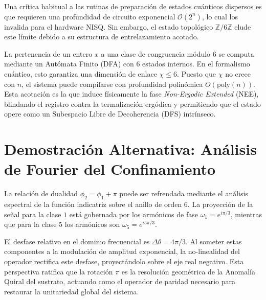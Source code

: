 \documentclass[12pt,a4paper]{article}
\theoremstyle{plain}
\theoremstyle{definition}
\theoremstyle{remark}
\begin{document}
Una crítica habitual a las rutinas de preparación de estados cuánticos dispersos es que requieren una profundidad de circuito exponencial $\mathcal{O}(2^n)$, lo cual los invalida para el hardware NISQ. Sin embargo, el estado topológico $\mathbb{Z}/6\mathbb{Z}$ elude este límite debido a su estructura de entrelazamiento acotado.

La pertenencia de un entero $x$ a una clase de congruencia módulo 6 se computa mediante un Autómata Finito (DFA) con 6 estados internos. En el formalismo cuántico, esto garantiza una dimensión de enlace $\chi \le 6$. Puesto que $\chi$ no crece con $n$, el sistema puede compilarse con profundidad polinómica $O(\text{poly}(n))$. Esta acotación es la que induce físicamente la fase \textit{Non-Ergodic Extended} (NEE), blindando el registro contra la termalización ergódica y permitiendo que el estado opere como un Subespacio Libre de Decoherencia (DFS) intrínseco.

\section{Demostración Alternativa: Análisis de Fourier del Confinamiento}
\label{app:fourier}

La relación de dualidad $\phi_2 = \phi_1 + \pi$ puede ser refrendada mediante el análisis espectral de la función indicatriz sobre el anillo de orden 6. La proyección de la señal para la clase $1$ está gobernada por los armónicos de fase $\omega_1 = e^{i\pi/3}$, mientras que para la clase $5$ los armónicos son $\omega_5 = e^{i5\pi/3}$. 

El desfase relativo en el dominio frecuencial es $\Delta\theta = 4\pi/3$. Al someter estas componentes a la modulación de amplitud exponencial, la no-linealidad del operador rectifica este desfase, proyectándolo sobre el eje real negativo. Esta perspectiva ratifica que la rotación $\pi$ es la resolución geométrica de la Anomalía Quiral del sustrato, actuando como el operador de paridad necesario para restaurar la unitariedad global del sistema.
\end{document}

